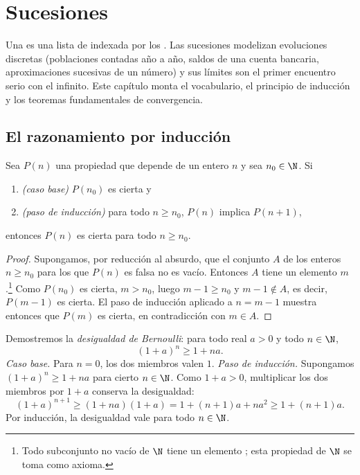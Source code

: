 \chapter{Sucesiones}\label{ch:g12:seq}

Una  es una lista de  indexada por los . Las sucesiones modelizan evoluciones discretas (poblaciones
contadas año a año, saldos de una cuenta bancaria, aproximaciones sucesivas
de un número) y sus límites son el primer encuentro serio con el infinito.
Este capítulo monta el vocabulario, el principio de inducción y los
teoremas fundamentales de convergencia.

\section{El razonamiento por inducción}

\begin{theorem}\label{thm:g12:seq:induction}
Sea $P(n)$ una propiedad que depende de un entero $n$ y sea
$n_0 \in \N$. Si
\begin{enumerate}
  \item \emph{(caso base)} $P(n_0)$ es cierta y
  \item \emph{(paso de inducción)} para todo $n \geq n_0$, $P(n)$ implica
        $P(n+1)$,
\end{enumerate}
entonces $P(n)$ es cierta para todo $n \geq n_0$.
\end{theorem}

\begin{proof}
Supongamos, por reducción al absurdo, que el conjunto $A$ de los enteros
$n \geq n_0$ para los que $P(n)$ es falsa no es vacío. Entonces $A$ tiene
un elemento  $m$.\footnote{Todo subconjunto no vacío de $\N$ tiene un
elemento ; esta propiedad de $\N$ se toma como axioma.} Como
$P(n_0)$ es cierta, $m > n_0$, luego $m - 1 \geq n_0$ y $m-1 \notin A$, es
decir, $P(m-1)$ es cierta. El paso de inducción aplicado a $n = m-1$
muestra entonces que $P(m)$ es cierta, en contradicción con $m \in A$.
\end{proof}

\begin{example}\label{ex:g12:seq:bernoulli}
Demostremos la \emph{desigualdad de Bernoulli}: para todo real $a > 0$ y
todo $n \in \N$,
\[
(1+a)^n \geq 1 + na.
\]
\emph{Caso base.} Para $n = 0$, los dos miembros valen $1$.
\emph{Paso de inducción.} Supongamos $(1+a)^n \geq 1+na$ para cierto
$n \in \N$. Como $1 + a > 0$, multiplicar los dos miembros por $1+a$
conserva la desigualdad:
\[
(1+a)^{n+1} \geq (1+na)(1+a) = 1 + (n+1)a + na^2 \geq 1 + (n+1)a .
\]
Por inducción, la desigualdad vale para todo $n \in \N$.
\end{example}

